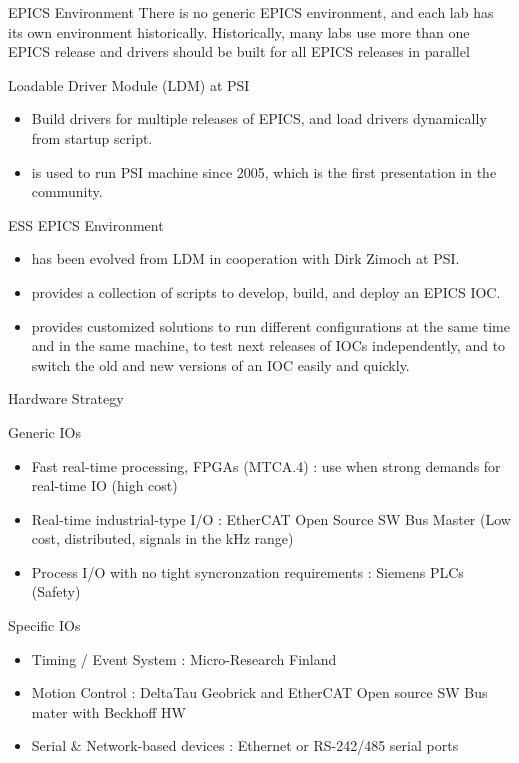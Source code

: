 \documentclass[
  9pt
  , table
  , ignorenonframetext
]{beamer}
\begin{document}
\begin{frame}{EPICS Environment}
  There is no generic EPICS environment, and each lab has its own environment historically. Historically, many labs use more than one EPICS release and drivers should be built for all EPICS releases in parallel
  \begin{block}{Loadable Driver Module (LDM) at PSI}
    \begin{itemize}
    \item Build drivers for multiple releases of EPICS, and load drivers dynamically from startup script.
    \item is used to run PSI machine since 2005, which is the first presentation in the community.
    \end{itemize}
  \end{block}

  \begin{exampleblock}{ESS EPICS Environment}
    \begin{itemize}
    \item has been evolved from LDM in cooperation with Dirk Zimoch at PSI.
    \item provides a collection of scripts to develop, build, and deploy an EPICS IOC.
    \item provides customized solutions to run different configurations at the same time and in the same machine, to test next releases of IOCs independently, and to switch the old and new versions of an IOC easily and quickly.
    \end{itemize}
  \end{exampleblock}
\end{frame}

\begin{frame}{Hardware Strategy}
  \begin{block}{Generic IOs}
    \begin{itemize}
    \item Fast real-time processing, FPGAs (MTCA.4) : use when strong demands for real-time IO (high cost)
    \item Real-time industrial-type I/O : EtherCAT Open Source SW Bus Master (Low cost, distributed, signals in the kHz range)
    \item Process I/O with no tight syncronzation requirements : Siemens PLCs (Safety)
    \end{itemize}
  \end{block}
 \begin{exampleblock}{Specific IOs}
    \begin{itemize}
    \item Timing / Event System : Micro-Research Finland 
    \item Motion Control :  DeltaTau Geobrick and EtherCAT Open source SW Bus mater with Beckhoff HW
    \item Serial \& Network-based devices : Ethernet or RS-242/485 serial ports 
    \end{itemize}
  \end{exampleblock}
  
\end{frame}
\end{document}
